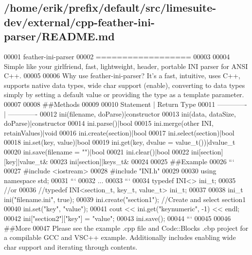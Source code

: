 \subsection{/home/erik/prefix/default/src/limesuite-\/dev/external/cpp-\/feather-\/ini-\/parser/\+R\+E\+A\+D\+ME.md}

\begin{DoxyCode}
00001 feather-ini-parser
00002 ==================
00003 
00004 Simple like your girlfriend, fast, lightweight, header, portable INI parser for ANSI C++.
00005 
00006 Why use feather-ini-parser? It's a fast, intuitive, uses C++, supports native data types, wide char
       support (enable), converting to data types simply by setting a default value or providing the type as a
       template parameter.
00007 
00008 ##Methods
00009 
00010 Statement     | Return Type
00011 ------------- | -------------
00012 ini(filename, doParse)|constructor
00013 ini(data, dataSize, doParse)|constructor
00014 ini.parse()|bool
00015 ini.merge(other INI, retainValues)|void
00016 ini.create(section)|bool
00017 ini.select(section)|bool
00018 ini.set(key, value)|bool
00019 ini.get(key, dvalue = value\_t())|dvalue\_t
00020 ini.save(filename = "")|bool
00021 ini.clear()|bool
00022 ini[section][key]|value\_t&
00023 ini[section]|keys\_t&
00024 
00025 ##Example
00026 ```
00027 #include <iostream>
00028 #include "INI.h"
00029 
00030 using namespace std;
00031 ```
00032 ...
00033 ```
00034 typedef INI<> ini\_t;
00035 //or
00036 //typedef INI<section\_t, key\_t, value\_t> ini\_t;
00037 
00038 ini\_t ini("filename.ini", true);
00039 ini.create("section1"); //Create and select section1
00040 ini.set("key", "value");
00041 cout << ini.get("keynumeric", -1) << endl;
00042 ini["section2"]["key"] = "value";
00043 ini.save();
00044 ```
00045 
00046 ##More
00047 Please see the example .cpp file and Code::Blocks .cbp project for a compilable GCC and VSC++ example.
       Additionally includes enabling wide char support and iterating through contents.
\end{DoxyCode}

